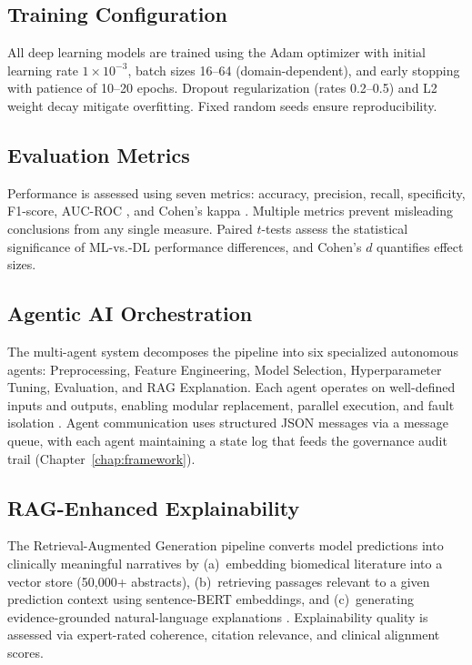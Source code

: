 \subsection{Training Configuration}

All deep learning models are trained using the Adam optimizer \citep{kingma2015adam} with initial learning rate $1 \times 10^{-3}$, batch sizes 16--64 (domain-dependent), and early stopping with patience of 10--20 epochs. Dropout regularization \citep{dropout2014srivastava} (rates 0.2--0.5) and L2 weight decay mitigate overfitting. Fixed random seeds ensure reproducibility.

\subsection{Evaluation Metrics}

Performance is assessed using seven metrics: accuracy, precision, recall, specificity, F1-score, AUC-ROC \citep{fawcett2006roc}, and Cohen's kappa \citep{cohen1960kappa}. Multiple metrics prevent misleading conclusions from any single measure. Paired $t$-tests assess the statistical significance of ML-vs.-DL performance differences, and Cohen's $d$ quantifies effect sizes.

\subsection{Agentic AI Orchestration}

The multi-agent system decomposes the pipeline into six specialized autonomous agents: Preprocessing, Feature Engineering, Model Selection, Hyperparameter Tuning, Evaluation, and RAG Explanation. Each agent operates on well-defined inputs and outputs, enabling modular replacement, parallel execution, and fault isolation \citep{wang2024agentai}. Agent communication uses structured JSON messages via a message queue, with each agent maintaining a state log that feeds the governance audit trail (Chapter~\ref{chap:framework}).

\subsection{RAG-Enhanced Explainability}

The Retrieval-Augmented Generation pipeline converts model predictions into clinically meaningful narratives by (a)~embedding biomedical literature into a vector store (50,000+ abstracts), (b)~retrieving passages relevant to a given prediction context using sentence-BERT embeddings, and (c)~generating evidence-grounded natural-language explanations \citep{lewis2020rag, gao2024rag}. Explainability quality is assessed via expert-rated coherence, citation relevance, and clinical alignment scores.

